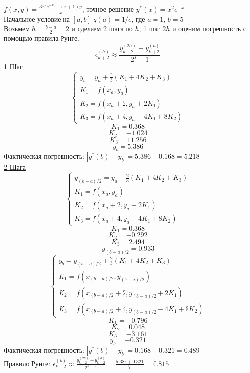 \documentclass{article}
\begin{document}
	$\displaystyle f(x,y) = \frac{3x^2e^{-x} - (x+1)y}{x}$, точное решение $y^*(x) = x^2e^{-x}$\\
	Начальное условие на $[a,b]$ $y(a) = 1/e$, где $a = 1$, $b = 5$\\ 
	Возьмем $\displaystyle h = \frac{b-a}{2} = 2$ и сделаем 2 шага по $h$, 1 шаг $2h$ и оценим погрешность с помощью правила Рунге.\\
	$$\epsilon^{(h)}_{k+2} \approx \frac{y^{(2h)}_{k+2} - y^{(h)}_{k+2}}{2^s - 1} $$
	\underline{1 Шаг}\\
	\begin{equation}
		\begin{cases}
			y_b = y_a + \frac{2}{3}(K_1 + 4K_2 + K_3)\\
			K_1 = f(x_a, y_a)\\
			K_2 = f(x_a + 2, y_a + 2K_1)\\
			K_3 = f(x_a + 4, y_a - 4K_1 + 8K_2)
		\end{cases}	
	\end{equation}
	$$K_1 = 0.368$$
	$$K_2 = -1.024$$
	$$K_3 = 11.256$$
	$$y_b = 5.386$$
	Фактическая погрешность: $|y^*(b) - y_b| = 5.386 - 0.168 = 5.218$\\
	\underline{2 Шага}\\
	\begin{equation}
		\begin{cases}
			y_{(b-a)/2} = y_a + \frac{2}{3}(K_1 + 4K_2 + K_3)\\
			K_1 = f(x_a, y_a)\\
			K_2 = f(x_a + 2, y_a + 2K_1)\\
			K_3 = f(x_a + 4, y_a - 4K_1 + 8K_2)
		\end{cases}	
	\end{equation}
	$$K_1 = 0.368$$
	$$K_2 = -0.292$$
	$$K_3 = 2.494$$
	$$y_{(b-a)/2} = 0.933$$
	\begin{equation}
		\begin{cases}
			y_b = y_{(b-a)/2} + \frac{2}{3}(K_1 + 4K_2 + K_3)\\
			K_1 = f(x_{(b-a)/2}, y_{(b-a)/2})\\
			K_2 = f(x_{(b-a)/2} + 2, y_{(b-a)/2} + 2K_1)\\
			K_3 = f(x_{(b-a)/2} + 4, y_{(b-a)/2} - 4K_1 + 8K_2)
		\end{cases}	
	\end{equation}
	$$K_1 = -0.796$$
	$$K_2 = 0.048$$
	$$K_3 = -3.161$$
	$$y_b = -0.321$$
	Фактическая погрешность: $|y^*(b) - y_b| = 0.168 + 0.321 = 0.489$\\
	Правило Рунге: $\displaystyle \epsilon^{(h)}_{k+2} \approx \frac{y^{(2h)}_{k+2} - y^{(h)}_{k+2}}{2^s - 1} = \frac{5.386 + 0.321}{7} = 0.815$\\
\end{document}
